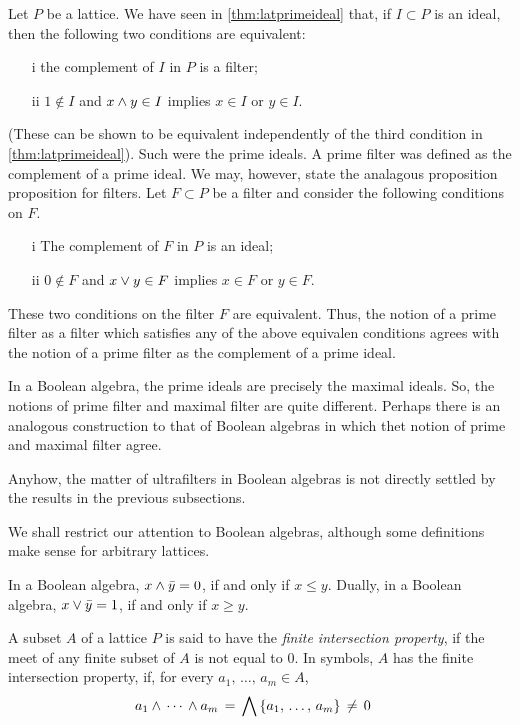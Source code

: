 \begin{remarkPrimeFilterIsPrimeFilter}
	Let $P$ be a lattice. We have seen in \ref{thm:latprimeideal} that,
	if $I\subset P$ is an ideal, then the following two conditions are
	equivalent:
	\begin{itemize}
		\item[i] the complement of $I$ in $P$ is a filter;
		\item[ii] $1\not\in I$ and $x\wedge y\in I$ implies
			$x\in I$ or $y\in I$.
	\end{itemize}
	(These can be shown to be equivalent independently of the
	third condition in \ref{thm:latprimeideal}).
	Such were the prime ideals. A prime filter was defined as the
	complement of a prime ideal. We may, however, state the analagous
	proposition proposition for filters. Let $F\subset P$ be a filter
	and consider the following conditions on $F$.
	\begin{itemize}
		\item[i] The complement of $F$ in $P$ is an ideal;
		\item[ii] $0\not\in F$ and $x\vee y\in F$ implies
			$x\in F$ or $y\in F$.
	\end{itemize}
	These two conditions on the filter $F$ are equivalent. Thus, the
	notion of a prime filter as a filter which satisfies any of the
	above equivalen conditions agrees with the notion of a prime 
	filter as the complement of a prime ideal.

	In a Boolean algebra, the prime ideals are precisely the maximal
	ideals. So, the notions of prime filter and maximal filter are quite
	different. Perhaps there is an analogous construction to that of
	Boolean algebras in which thet notion of prime and maximal filter
	agree.

	Anyhow, the matter of ultrafilters in Boolean algebras is not
	directly settled by the results in the previous subsections.
\end{remarkPrimeFilterIsPrimeFilter}

We shall restrict our attention to Boolean algebras, although some definitions
make sense for arbitrary lattices.

\begin{lemmaInABooleanAlgebra}\label{thm:inabooleanalgebra}
	In a Boolean algebra, $x\wedge\bar{y}=0$, if and only if
	$x\leq y$. Dually, in a Boolean algebra, $x\vee\bar{y}=1$,
	if and only if $x\geq y$.
\end{lemmaInABooleanAlgebra}

A subset $A$ of a lattice $P$ is said to have the \emph{finite intersection %
property}, if the meet of any finite subset of $A$ is not equal to $0$. In
symbols, $A$ has the finite intersection property, if, for every
$a_{1},\,\dots,\,a_{m}\in A$,
\begin{align*}
	a_{1}\wedge\,\cdots\,\wedge a_{m} &
		\,=\,\bigwedge\left\lbrace a_{1},\,\dots,\,a_{m}
			\right\rbrace
		\,\not=\, 0
\end{align*}
%

